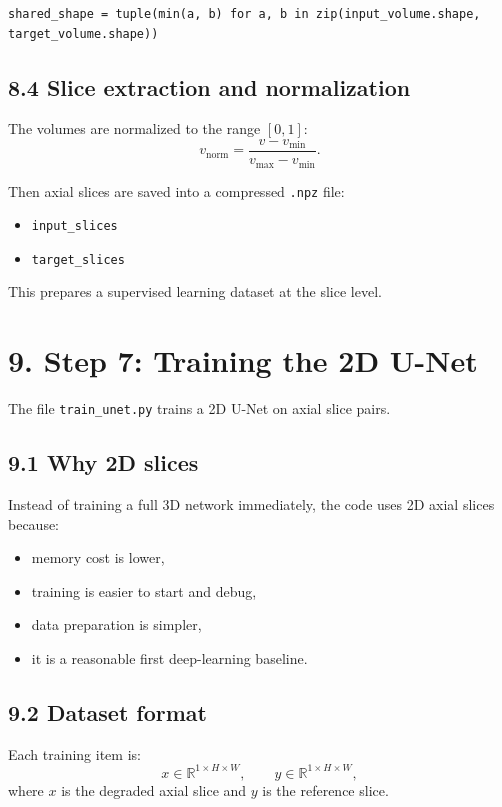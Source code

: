 \documentclass[12pt,a4paper]{article}
\begin{document}
\begin{lstlisting}[style=py,caption={Shape alignment by center crop}]
shared_shape = tuple(min(a, b) for a, b in zip(input_volume.shape, target_volume.shape))
\end{lstlisting}

\subsection*{8.4 Slice extraction and normalization}
The volumes are normalized to the range $[0,1]$:
\[
v_{\text{norm}} = \frac{v - v_{\min}}{v_{\max} - v_{\min}}.
\]

Then axial slices are saved into a compressed \texttt{.npz} file:
\begin{itemize}[leftmargin=*]
\item \texttt{input\_slices}
\item \texttt{target\_slices}
\end{itemize}

This prepares a supervised learning dataset at the slice level.

\section*{9. Step 7: Training the 2D U-Net}
The file \texttt{train\_unet.py} trains a 2D U-Net on axial slice pairs.

\subsection*{9.1 Why 2D slices}
Instead of training a full 3D network immediately, the code uses 2D axial slices because:
\begin{itemize}[leftmargin=*]
\item memory cost is lower,
\item training is easier to start and debug,
\item data preparation is simpler,
\item it is a reasonable first deep-learning baseline.
\end{itemize}

\subsection*{9.2 Dataset format}
Each training item is:
\[
x \in \mathbb{R}^{1 \times H \times W},\qquad y \in \mathbb{R}^{1 \times H \times W},
\]
where $x$ is the degraded axial slice and $y$ is the reference slice.
\end{document}
